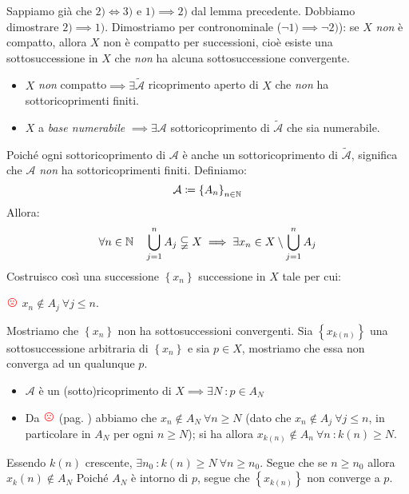 \begin{demonstration}
Sappiamo già che $2)\iff 3)$ e $1)\implies 2)$ dal lemma precedente. Dobbiamo dimostrare $2)\implies 1)$. Dimostriamo per contronominale ($\neg 1)\implies \neg 2)$): se $X$ \textit{non} è compatto, allora $X$ non è compatto per successioni, cioè esiste una sottosuccessione in $X$ che \textit{non} ha alcuna sottosuccessione convergente.\\
\begin{itemize}
	\item $X$ \textit{non} compatto$\implies \exists \widetilde{\mathcal{A}}$ ricoprimento aperto di $X$ che \textit{non} ha sottoricoprimenti finiti.
	\item $X$ a \textit{base numerabile} $\implies\exists\mathcal{A}$ sottoricoprimento di $\widetilde{\mathcal{A}}$ che sia numerabile.
\end{itemize}
Poiché ogni sottoricoprimento di $\mathcal{A}$ è anche un sottoricoprimento di $\widetilde{\mathcal{A}}$, significa che $\mathcal{A}$ \textit{non} ha sottoricoprimenti finiti. Definiamo:
\begin{equation*}
\mathcal{A}\coloneqq\left\{A_n\right\}_{n\in\mathbb{N}}
\end{equation*}
Allora:
\begin{equation*}
\forall n\in\mathbb{N}\quad \mathop{{\bigcup}}\displaylimits_{j=1}^n A_j\subsetneqq X\implies \exists x_n\in X\setminus \mathop{{\bigcup}}\displaylimits_{j=1}^n A_j
\end{equation*}
Costruisco così una successione $\left\{x_n\right\}$ successione in $X$ tale per cui:
\begin{center}
	\label{notatriste} $\textcolor{red}{{\large \frownie{}}}$ $x_n\notin A_j\ \forall j\leq n$.
\end{center}
Mostriamo che $\left\{x_n\right\}$ non ha sottosuccessioni convergenti. Sia $\left\{x_{k\left(n\right)}\right\}$ una sottosuccessione arbitraria di $\left\{x_n\right\}$ e sia $p\in X$, mostriamo che essa non converga ad un qualunque $p$.\\
\begin{itemize}
	\item $\mathcal{A}$ è un (sotto)ricoprimento di $X\implies \exists N\ \colon p\in A_N$
	\item Da $\textcolor{red}{{\large \frownie{}}}$ (pag. \pageref{notatriste}) abbiamo che $x_n \notin A_N \ \forall n\geq N$  (dato che $x_n \notin A_j \ \forall j\leq n$, in particolare in $A_N$ per ogni $n\geq N$); si ha allora $x_{k\left(n\right)}\notin A_n\ \forall n\ \colon k\left(n\right)\geq N$.
\end{itemize}
Essendo $k\left(n\right)$ crescente, $\exists n_0\ \colon k\left(n\right)\geq N\ \forall n\geq n_0$. Segue che se $n\geq n_0$ allora $x_k\left(n\right)\notin A_N$ 
Poiché $A_N$ è intorno di $p$, segue che $\left\{x_{k\left(n\right)}\right\}$ non converge a $p$.
\end{demonstration}
